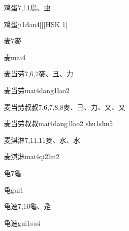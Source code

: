 \begin{entry}{鸡蛋}{7,11}{⿃、⾍}
  \begin{phonetics}{鸡蛋}{ji1dan4}[][HSK 1]
  \end{phonetics}
\end{entry}

\begin{entry}{麦}{7}{⿆}
  \begin{phonetics}{麦}{mai4}
  \end{phonetics}
\end{entry}

\begin{entry}{麦当劳}{7,6,7}{⿆、⼹、⼒}
  \begin{phonetics}{麦当劳}{mai4dang1lao2}
  \end{phonetics}
\end{entry}

\begin{entry}{麦当劳叔叔}{7,6,7,8,8}{⿆、⼹、⼒、⼜、⼜}
  \begin{phonetics}{麦当劳叔叔}{mai4dang1lao2 shu1shu5}
  \end{phonetics}
\end{entry}

\begin{entry}{麦淇淋}{7,11,11}{⿆、⽔、⽔}
  \begin{phonetics}{麦淇淋}{mai4qi2lin2}
  \end{phonetics}
\end{entry}

\begin{entry}{龟}{7}{⿔}
  \begin{phonetics}{龟}{gui1}
  \end{phonetics}
\end{entry}

\begin{entry}{龟速}{7,10}{⿔、⾡}
  \begin{phonetics}{龟速}{gui1su4}
  \end{phonetics}
\end{entry}


